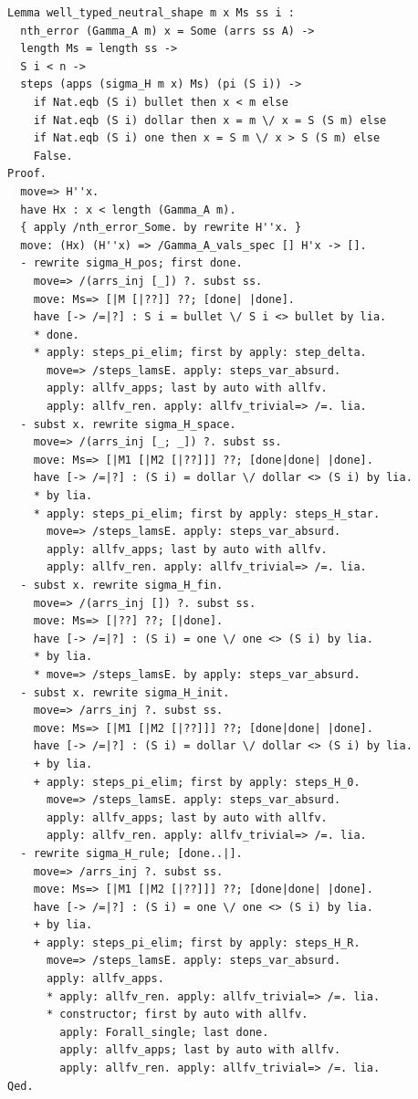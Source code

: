 \documentclass[10pt,a4paper]{amsart}
\begin{document}
\begin{lstlisting}
Lemma well_typed_neutral_shape m x Ms ss i :
  nth_error (Gamma_A m) x = Some (arrs ss A) ->
  length Ms = length ss ->
  S i < n ->
  steps (apps (sigma_H m x) Ms) (pi (S i)) ->
    if Nat.eqb (S i) bullet then x < m else
    if Nat.eqb (S i) dollar then x = m \/ x = S (S m) else
    if Nat.eqb (S i) one then x = S m \/ x > S (S m) else
    False.
Proof.
  move=> H''x.
  have Hx : x < length (Gamma_A m).
  { apply /nth_error_Some. by rewrite H''x. }
  move: (Hx) (H''x) => /Gamma_A_vals_spec [] H'x -> [].
  - rewrite sigma_H_pos; first done.
    move=> /(arrs_inj [_]) ?. subst ss.
    move: Ms=> [|M [|??]] ??; [done| |done].
    have [-> /=|?] : S i = bullet \/ S i <> bullet by lia.
    * done.
    * apply: steps_pi_elim; first by apply: step_delta.
      move=> /steps_lamsE. apply: steps_var_absurd.
      apply: allfv_apps; last by auto with allfv.
      apply: allfv_ren. apply: allfv_trivial=> /=. lia.
  - subst x. rewrite sigma_H_space.
    move=> /(arrs_inj [_; _]) ?. subst ss.
    move: Ms=> [|M1 [|M2 [|??]]] ??; [done|done| |done].
    have [-> /=|?] : (S i) = dollar \/ dollar <> (S i) by lia.
    * by lia.
    * apply: steps_pi_elim; first by apply: steps_H_star.
      move=> /steps_lamsE. apply: steps_var_absurd.
      apply: allfv_apps; last by auto with allfv.
      apply: allfv_ren. apply: allfv_trivial=> /=. lia.
  - subst x. rewrite sigma_H_fin.
    move=> /(arrs_inj []) ?. subst ss.
    move: Ms=> [|??] ??; [|done].
    have [-> /=|?] : (S i) = one \/ one <> (S i) by lia.
    * by lia.
    * move=> /steps_lamsE. by apply: steps_var_absurd.
  - subst x. rewrite sigma_H_init.
    move=> /arrs_inj ?. subst ss.
    move: Ms=> [|M1 [|M2 [|??]]] ??; [done|done| |done].
    have [-> /=|?] : (S i) = dollar \/ dollar <> (S i) by lia.
    + by lia.
    + apply: steps_pi_elim; first by apply: steps_H_0.
      move=> /steps_lamsE. apply: steps_var_absurd.
      apply: allfv_apps; last by auto with allfv.
      apply: allfv_ren. apply: allfv_trivial=> /=. lia.
  - rewrite sigma_H_rule; [done..|].
    move=> /arrs_inj ?. subst ss.
    move: Ms=> [|M1 [|M2 [|??]]] ??; [done|done| |done].
    have [-> /=|?] : (S i) = one \/ one <> (S i) by lia.
    + by lia.
    + apply: steps_pi_elim; first by apply: steps_H_R.
      move=> /steps_lamsE. apply: steps_var_absurd.
      apply: allfv_apps.
      * apply: allfv_ren. apply: allfv_trivial=> /=. lia.
      * constructor; first by auto with allfv.
        apply: Forall_single; last done.
        apply: allfv_apps; last by auto with allfv.
        apply: allfv_ren. apply: allfv_trivial=> /=. lia.
Qed.


\end{lstlisting}
\end{document}
